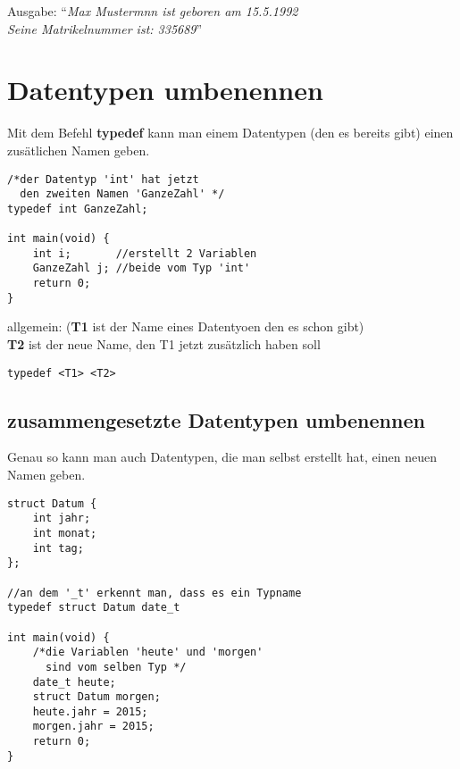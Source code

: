 \documentclass[c_worksheet.tex]{subfiles}
\begin{document}
\begin{tabbing}
Ausgabe: ``\=\textit{Max Mustermnn ist geboren am 15.5.1992}\\
           \>\textit{Seine Matrikelnummer ist: 335689}''
\end{tabbing}

\section{Datentypen umbenennen}

Mit dem Befehl \textbf{typedef} kann man einem Datentypen (den es bereits gibt) einen zusätlichen Namen geben.

\begin{lstlisting}
/*der Datentyp 'int' hat jetzt
  den zweiten Namen 'GanzeZahl' */
typedef int GanzeZahl;

int main(void) {
    int i;       //erstellt 2 Variablen
    GanzeZahl j; //beide vom Typ 'int'
    return 0;
}
\end{lstlisting}

\begin{tabbing}
allgemein: (\=\textbf{T1} ist der Name eines Datentyoen den es schon gibt)\\
            \>\textbf{T2} ist der neue Name, den T1 jetzt zusätzlich haben soll
\end{tabbing}
\begin{lstlisting}[numbers=none]
typedef <T1> <T2>
\end{lstlisting}

\subsection{zusammengesetzte Datentypen umbenennen}

Genau so kann man auch Datentypen, die man selbst erstellt hat, einen neuen Namen geben.

\begin{lstlisting}
struct Datum {
    int jahr;
    int monat;
    int tag;
};

//an dem '_t' erkennt man, dass es ein Typname
typedef struct Datum date_t

int main(void) {
    /*die Variablen 'heute' und 'morgen'
      sind vom selben Typ */
    date_t heute;
    struct Datum morgen;
    heute.jahr = 2015;
    morgen.jahr = 2015;
    return 0;
}
\end{lstlisting}
\end{document}
